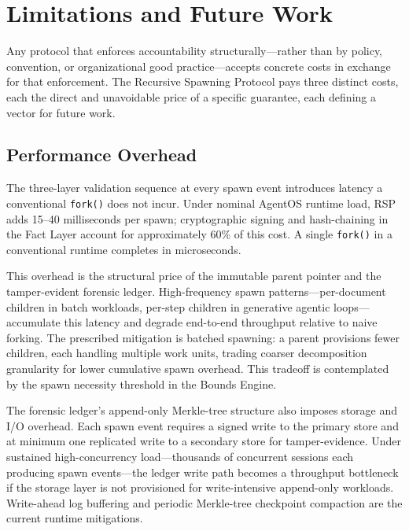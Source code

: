 \section{Limitations and Future Work}
\label{sec:rs-limitations}

Any protocol that enforces accountability structurally---rather than by policy, convention, or organizational good practice---accepts concrete costs in exchange for that enforcement. The Recursive Spawning Protocol pays three distinct costs, each the direct and unavoidable price of a specific guarantee, each defining a vector for future work.

\subsection{Performance Overhead}
\label{sec:rs-perf-overhead}

The three-layer validation sequence at every spawn event introduces latency a conventional \texttt{fork()} does not incur. Under nominal AgentOS runtime load, RSP adds \numrange{15}{40} milliseconds per spawn; cryptographic signing and hash-chaining in the Fact Layer account for approximately 60\% of this cost. A single \texttt{fork()} in a conventional runtime completes in microseconds.

This overhead is the structural price of the immutable parent pointer and the tamper-evident forensic ledger. High-frequency spawn patterns---per-document children in batch workloads, per-step children in generative agentic loops---accumulate this latency and degrade end-to-end throughput relative to naive forking. The prescribed mitigation is batched spawning: a parent provisions fewer children, each handling multiple work units, trading coarser decomposition granularity for lower cumulative spawn overhead. This tradeoff is contemplated by the spawn necessity threshold in the Bounds Engine.

The forensic ledger's append-only Merkle-tree structure also imposes storage and I/O overhead. Each spawn event requires a signed write to the primary store and at minimum one replicated write to a secondary store for tamper-evidence. Under sustained high-concurrency load---thousands of concurrent sessions each producing spawn events---the ledger write path becomes a throughput bottleneck if the storage layer is not provisioned for write-intensive append-only workloads. Write-ahead log buffering and periodic Merkle-tree checkpoint compaction are the current runtime mitigations.

